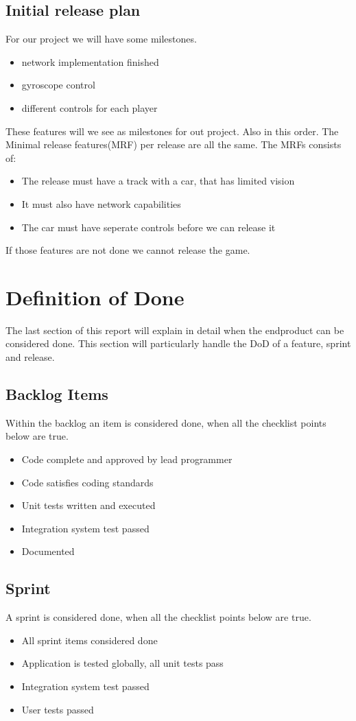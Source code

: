 \documentclass{article}
\begin{document}
\subsection{Initial release plan}
For our project we will have some milestones.\\
\begin{itemize}
\item network implementation finished
\item gyroscope control
\item different controls for each player
\end{itemize}
These features will we see as milestones for out project. Also in this order.
The Minimal release features(MRF) per release are all the same. The MRFs consists of:
\begin{itemize}
\item The release must have a track with a car, that has limited vision
\item It must also have network capabilities
\item The car must have seperate controls before we can release it
\end{itemize}
If those features are not done we cannot release the game.
\section{Definition of Done}
The last section of this report will explain in detail when the endproduct can be considered done. This section will particularly handle the DoD of a feature, sprint and release.
\subsection{Backlog Items}
Within the backlog an item is considered done, when all the checklist points below are true.
\begin{itemize}
	\item Code complete and approved by lead programmer
	\item Code satisfies coding standards
	\item Unit tests written and executed
	\item Integration system test passed
	\item Documented
\end{itemize}
\subsection{Sprint}
A sprint is considered done, when all the checklist points below are true.
\begin{itemize}
	\item All sprint items considered done
	\item Application is tested globally, all unit tests pass
	\item Integration system test passed
	\item User tests passed
\end{itemize}
\end{document}
